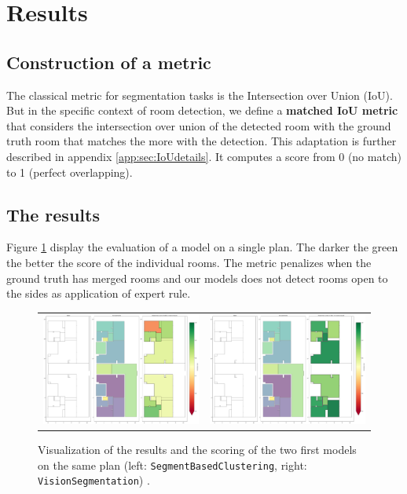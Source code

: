 \documentclass[11pt]{article}
\begin{document}
\section{Results}

\subsection{Construction of a metric}
\label{sec:metric}
The classical metric for segmentation tasks is the Intersection over Union (IoU).
But in the specific context of room detection, we define a \textbf{matched IoU
metric} that considers the intersection over union of the detected room with the
ground truth room that matches the more with the detection.
This adaptation is further described in appendix 
\ref{app:sec:IoUdetails}. It computes a score from 0 (no match) to 1 (perfect 
overlapping). 
\subsection{The results}
Figure \ref{fig:result_segmentation} display the evaluation of a model on a single 
plan. The darker the green the better the score of the individual rooms. The metric 
    penalizes when the ground truth has merged rooms and our models does not detect
    rooms open to the sides as application of expert rule.
\begin{figure}[h]
    \centering
    \begin{tabular}{cc}
        \includegraphics[width=0.45\linewidth]{figures/ScoreSeg.png} &
        \includegraphics[width=0.45\linewidth]{figures/ScoreCV.png} \\
        
    \end{tabular}
    \caption{Visualization of the results and the scoring of the two first models 
    on the same plan
    (left: \texttt{SegmentBasedClustering}, right: \texttt{VisionSegmentation})
     .}
    \label{fig:result_segmentation}
\end{figure}
\end{document}
